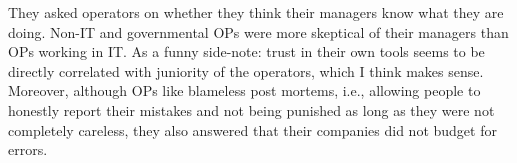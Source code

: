 \documentclass{article}
\begin{document}
They asked operators on whether they think their managers know what they are doing. Non-IT and governmental OPs were more skeptical of their managers than OPs working in IT. As a funny side-note: trust in their own tools seems to be directly correlated with juniority of the operators, which I think makes sense. Moreover, although OPs like blameless post mortems, i.e., allowing people to honestly report their mistakes and not being punished as long as they were not completely careless, they also answered that their companies did not budget for errors.














\end{document}
